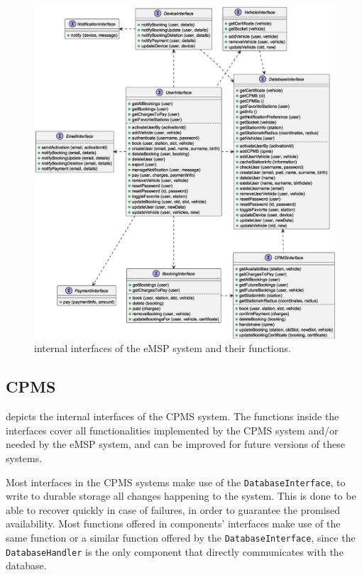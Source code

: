 \begin{figure}[h!]
    \centering
    \includegraphics[width=0.84\columnwidth]{./images/interfaces/emsp}
    \caption{internal interfaces of the eMSP system and their functions.}
\end{figure}

\subsection{CPMS}

 depicts the internal interfaces of the CPMS system. The functions inside the interfaces cover all functionalities implemented by the CPMS system and/or needed by the eMSP system, and can be improved for future versions of these systems.\medskip

Most interfaces in the CPMS systems make use of the \texttt{DatabaseInterface}, to write to durable storage all changes happening to the system. This is done to be able to recover quickly in case of failures, in order to guarantee the promised availability. Most functions offered in components' interfaces make use of the same function or a similar function offered by the \texttt{DatabaseInterface}, since the \texttt{DatabaseHandler} is the only component that directly communicates with the database.

